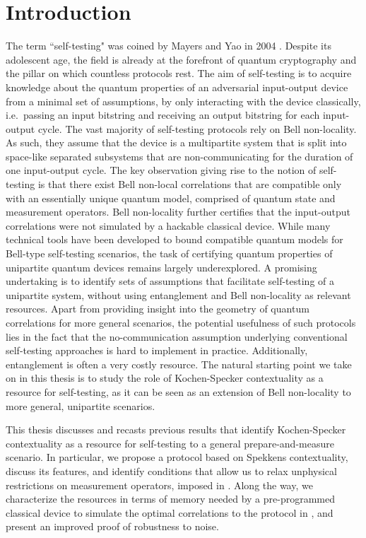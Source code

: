 \chapter{Introduction}
The term ``self-testing" was coined by Mayers and Yao in 2004 \cite{Mayers2003}. Despite its adolescent age, the field is already at the forefront of quantum cryptography and the pillar on which countless protocols rest. The aim of self-testing is to acquire knowledge about the quantum properties of an adversarial input-output device from a minimal set of assumptions, by only interacting with the device classically, i.e.\ passing an input bitstring and receiving an output bitstring for each input-output cycle. The vast majority of self-testing protocols rely on Bell non-locality. As such, they assume that the device is a multipartite system that is split into space-like separated subsystems that are non-communicating for the duration of one input-output cycle. The key observation giving rise to the notion of self-testing is that there exist Bell non-local correlations that are compatible only with an essentially unique quantum model, comprised of quantum state and measurement operators. Bell non-locality further certifies that the input-output correlations were not simulated by a hackable classical device. While
many technical tools have been developed to bound compatible quantum models for Bell-type self-testing scenarios, the task of certifying quantum properties of unipartite quantum devices remains largely underexplored. A promising undertaking is to identify sets of assumptions that facilitate self-testing of a unipartite system, without using entanglement and Bell non-locality as relevant resources. Apart from providing insight into the geometry of quantum correlations for more general scenarios, the potential usefulness of such protocols lies in the fact that the no-communication assumption underlying conventional self-testing approaches is hard to implement in practice. Additionally, entanglement is often a very costly resource. The natural starting point we take on in this thesis is to study the role of Kochen-Specker contextuality as a resource for self-testing, as it can be seen as an extension of Bell non-locality to more general, unipartite scenarios. 

This thesis discusses and recasts previous results \cite{Bharti2019} that identify Kochen-Specker contextuality as a resource for self-testing to a general prepare-and-measure scenario. In particular, we propose a protocol based on Spekkens contextuality, discuss its features, and identify conditions that allow us to relax unphysical restrictions on measurement operators, imposed in \cite{Bharti2019}. Along the way, we characterize the resources in terms of memory needed by a pre-programmed classical device to simulate the optimal correlations to the protocol in \cite{Bharti2019}, and present an improved proof of robustness to noise.


